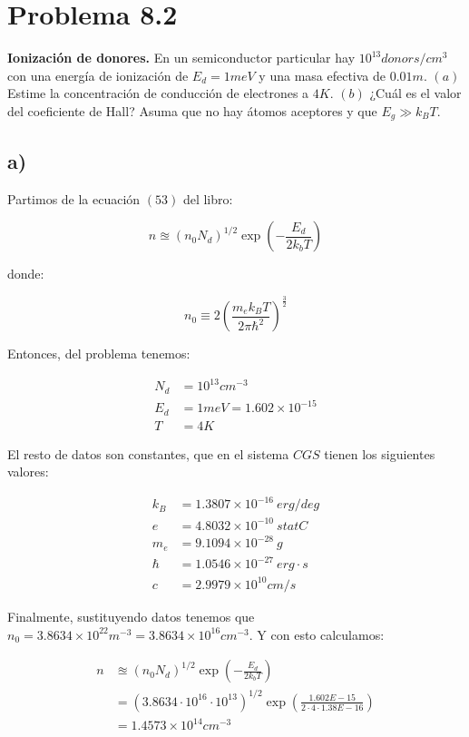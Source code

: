\section{Problema 8.2}
\textbf{Ionización de donores.} En un semiconductor particular hay $10^{13}donors/cm^3$ con una energía de ionización de $E_d=1meV$ y una masa efectiva de $0.01m$. $(a)$ Estime la concentración de conducción de electrones a $4K$. $(b)$ ¿Cuál es el valor del coeficiente de Hall? Asuma que no hay átomos aceptores y que $E_g\gg k_BT$.
\vspace{11pt}

\subsection{a)}
Partimos de la ecuación $(53)$ del libro:

\begin{equation}
    n\approxeq \left(n_0N_d\right)^{1/2}\exp\left(-\frac{E_d}{2k_bT}\right) \tag{53}
\end{equation}

donde:

\begin{equation*}
    n_0\equiv 2\left(\frac{m_ek_BT}{2\pi\hbar^2}\right)^{\frac{3}{2}}
\end{equation*}

Entonces, del problema tenemos:

\begin{align*}
    N_d & = 10^{13} cm^{-3}\\
    E_d & = 1 meV = 1.602\times 10^{-15}\\
    T & =4K
\end{align*}

El resto de datos son constantes, que en el sistema $CGS$ tienen los siguientes valores:

\begin{align*}
    k_B & = 1.3807\times 10^{-16}~ erg/deg\\
    e & = 4.8032\times 10^{-10}~ statC\\
    m_e & = 9.1094 \times 10^{-28}~ g\\
    \hbar & = 1.0546\times 10^{-27}~ erg\cdot s\\
    c &= 2.9979\times 10^{10}cm/s
\end{align*}

Finalmente, sustituyendo datos tenemos que $n_0=3.8634\times 10^{22}m^{-3}=3.8634\times 10^{16}cm^{-3}$. Y con esto calculamos:

\begin{align*}
    n   &\approxeq \left(n_0N_d\right)^{1/2}\exp\left(-\frac{E_d}{2k_bT}\right)\\
        &=\left(3.8634\cdot10^{16}\cdot 10^{13}\right)^{1/2}\exp\left(\frac{1.602E-15}{2\cdot 4 \cdot 1.38E-16}\right)\\
        &= 1.4573\times 10^{14}cm^{-3}
\end{align*}

